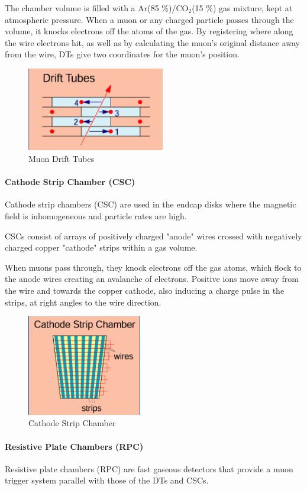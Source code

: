The chamber volume is filled with a Ar(85 $\%$)/CO$_{2}$(15 $\%$) gas mixture, kept at atmospheric pressure.  When a muon or any charged particle passes through the volume, it knocks electrons off the atoms of the gas. By registering where along the wire electrons hit, as well as by calculating the muon's original distance away from the wire, DTs give two coordinates for the muon’s position.
\begin{figure}[H]
  \centering
\includegraphics[width=6cm]{CMS_chapter_plots/DT}
  \caption{Muon Drift Tubes \label{fig:DT}}
\end{figure}
\paragraph{Cathode Strip Chamber (CSC)}
Cathode strip chambers (CSC) are used in the endcap disks where the magnetic field is inhomogeneous and particle rates are high.

CSCs consist of arrays of positively charged "anode" wires crossed with negatively charged copper "cathode" strips within a gas volume.

When muons pass through, they knock electrons off the gas atoms, which flock to the anode wires creating an avalanche of electrons. Positive ions move away from the wire and towards the copper cathode, also inducing a charge pulse in the strips, at right angles to the wire direction.
\begin{figure}[H]
  \centering
\includegraphics[width=5cm]{CMS_chapter_plots/CSC}
  \caption{Cathode Strip Chamber \label{fig:CSC}}
\end{figure}

\paragraph{Resistive Plate Chambers (RPC)}
Resistive plate chambers (RPC) are fast gaseous detectors that provide a muon trigger system parallel with those of the DTs and CSCs.

